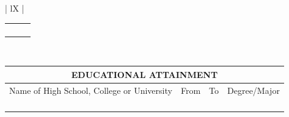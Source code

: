 \documentclass{article}
\begin{document}
\begin{Form}
\begin{center}
\begin{tabularx}{\textwidth}{ | lX | }
{\begin{tabularx}{\textwidth}{ | @{}X@{} | @{}X@{} | @{}X@{} | }
						\TextField[name=Empl1,width=\linewidth]{} & \TextField[name=Pos1,width=\linewidth]{} & \TextField[name=EmplDate1,width=\linewidth]{}\\
						\TextField[name=Empl2,width=\linewidth]{} & \TextField[name=Pos2,width=\linewidth]{} & \TextField[name=EmplDate2,width=\linewidth]{}\\
						\TextField[name=Empl3,width=\linewidth]{} & \TextField[name=Pos3,width=\linewidth]{} & \TextField[name=EmplDate3,width=\linewidth]{}\\
						\TextField[name=Empl4,width=\linewidth]{} & \TextField[name=Pos4,width=\linewidth]{} & \TextField[name=EmplDate4,width=\linewidth]{}\\
						\hline
					\end{tabularx}
				}\\
				\hline
			\end{tabularx}
		\end{center}

		\begin{center}
			\begin{tabularx}{\textwidth}{ | X  X  X  X | }
				\hline
				\multicolumn{4}{|c|}{EDUCATIONAL ATTAINMENT}\\
				\hline
				\multicolumn{1}{|X}{Name of High School, College or University} & \multicolumn{1}{c}{From} & \multicolumn{1}{c}{To} & \multicolumn{1}{c|}{Degree/Major}\\
				\TextField[name=SchoolName1,width=\linewidth]{} & \TextField[name=StartDate1,width=\linewidth]{} & \TextField[name=EndDate1,width=\linewidth]{} & \TextField[name=Degree1,width=\linewidth]{}\\
				\TextField[name=SchoolName2,width=\linewidth]{} & \TextField[name=StartDate2,width=\linewidth]{} & \TextField[name=EndDate2,width=\linewidth]{} & \TextField[name=Degree2,width=\linewidth]{}\\
				\TextField[name=SchoolName3,width=\linewidth]{} & \TextField[name=StartDate3,width=\linewidth]{} & \TextField[name=EndDate3,width=\linewidth]{} & \TextField[name=Degree3,width=\linewidth]{}\\
				\TextField[name=SchoolName4,width=\linewidth]{} & \TextField[name=StartDate4,width=\linewidth]{} & \TextField[name=EndDate4,width=\linewidth]{} & \TextField[name=Degree4,width=\linewidth]{}\\
				\hline
			\end{tabularx}
		\end{center}


\end{Form}
\end{document}

